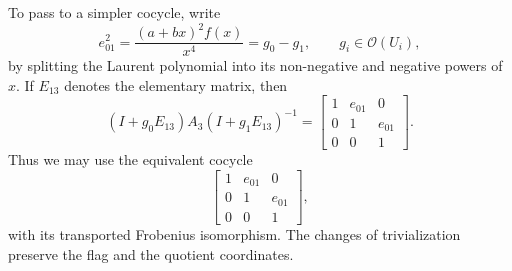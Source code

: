 \documentclass[12pt,a4]{amsart}
\theoremstyle{definition}
\begin{document}
\begin{appendix}
To pass to a simpler cocycle, write
\[
e_{01}^2=\frac{(a+bx)^2f(x)}{x^4}=g_0-g_1,
\qquad g_i\in\mathcal O(U_i),
\]
by splitting the Laurent polynomial into its non-negative and negative
powers of $x$. If $E_{13}$ denotes the elementary matrix, then
\[
(I+g_0E_{13})A_3(I+g_1E_{13})^{-1}
=\begin{bmatrix}1&e_{01}&0\\0&1&e_{01}\\0&0&1\end{bmatrix}.
\]
Thus we may use the equivalent cocycle
\begin{equation}\label{cocycle3}
\begin{bmatrix}1&e_{01}&0\\0&1&e_{01}\\0&0&1\end{bmatrix},
\end{equation}
with its transported Frobenius isomorphism. The changes of trivialization
preserve the flag and the quotient coordinates.


\end{appendix}
\end{document}
